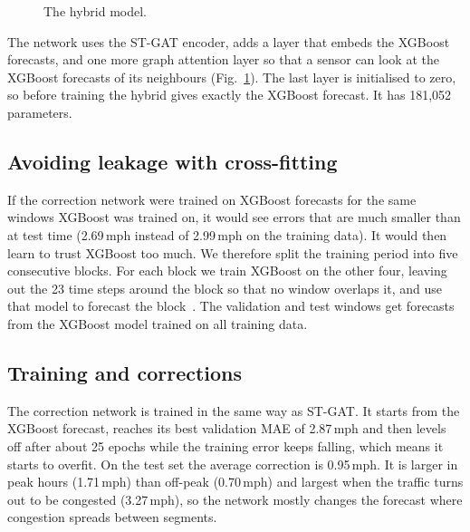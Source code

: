 \documentclass[11pt,a4paper]{article}
\begin{document}
\begin{figure}[H]
\centering
{}
\caption{The hybrid model.}
\label{fig:hybrid}
\end{figure}

The network uses the ST-GAT encoder, adds a layer that embeds the XGBoost forecasts, and one
more graph attention layer so that a sensor can look at the XGBoost forecasts of its
neighbours (Fig.~\ref{fig:hybrid}). The last layer is initialised to zero, so before training
the hybrid gives exactly the XGBoost forecast. It has 181,052 parameters.

\subsection{Avoiding leakage with cross-fitting}
If the correction network were trained on XGBoost forecasts for the same windows XGBoost was
trained on, it would see errors that are much smaller than at test time (2.69\,mph instead of
2.99\,mph on the training data). It would then learn to trust XGBoost too much. We therefore
split the training period into five consecutive blocks. For each block we train XGBoost on the
other four, leaving out the 23 time steps around the block so that no window overlaps it, and
use that model to forecast the block~\cite{wolpert1992stacking,bergmeir2012cv}. The
validation and test windows get forecasts from the XGBoost model trained on all training
data.

\subsection{Training and corrections}
The correction network is trained in the same way as ST-GAT. It starts from the XGBoost
forecast, reaches its best validation MAE of 2.87\,mph and then levels off after about 25
epochs while the training error keeps falling, which means it starts to overfit. On the test
set the average correction is 0.95\,mph. It is larger in peak hours (1.71\,mph) than off-peak
(0.70\,mph) and largest when the traffic turns out to be congested (3.27\,mph), so the
network mostly changes the forecast where congestion spreads between segments.
\end{document}
